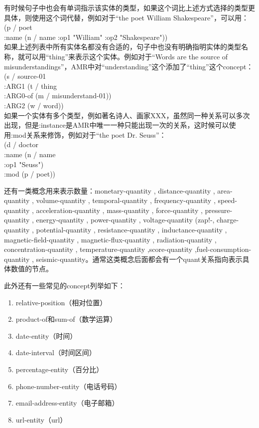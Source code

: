 \documentclass[master, winfont]{njuthesis}
\begin{document}
有时候句子中也会有单词指示该实体的类型，如果这个词比上述方式选择的类型更具体，则使用这个词代替，例如对于“the poet William Shakespeare”，可以用：
(p / poet\\
	:name (n / name :op1 "William" :op2 "Shakespeare"))\\

如果上述列表中所有实体名都没有合适的，句子中也没有明确指明实体的类型名称，就可以用“thing”来表示这个实体。例如对于“Words are the source of misunderstandings”，AMR中对“understanding”这个添加了“thing”这个concept：\\
(s / source-01\\
      :ARG1 (t / thing\\
            :ARG0-of (m / misunderstand-01))\\
      :ARG2 (w / word))\\

如果一个实体有多个类型，例如著名诗人、画家XXX，虽然同一种关系可以多次出现，但是:instance是AMR中唯一一种只能出现一次的关系，这时候可以使用:mod关系来修饰，例如对于“the poet Dr. Seuss”：\\
(d / doctor \\
	 :name (n / name \\
	 	    :op1 "Seuss")\\
	 :mod (p / poet))

还有一类概念用来表示数量：monetary-quantity , distance-quantity , area-quantity , volume-quantity , temporal-quantity , frequency-quantity , speed-quantity , acceleration-quantity , mass-quantity , force-quantity , pressure-quantity , energy-quantity , power-quantity , voltage-quantity (zap!-, charge-quantity , potential-quantity , resistance-quantity , inductance-quantity , magnetic-field-quantity , magnetic-flux-quantity , radiation-quantity , concentration-quantity , temperature-quantity ,score-quantity ,fuel-consumption-quantity , seismic-quantity。通常这类概念后面都会有一个quant关系指向表示具体数值的节点。

此外还有一些常见的concept列举如下：
\begin{enumerate}
	\item relative-position（相对位置）
	\item product-of和sum-of（数学运算）
	\item date-entity（时间）
	\item date-interval（时间区间）
	\item percentage-entity（百分比）
	\item phone-number-entity（电话号码）
	\item email-address-entity（电子邮箱）
	\item url-entity（url）
\end{enumerate}
\end{document}
